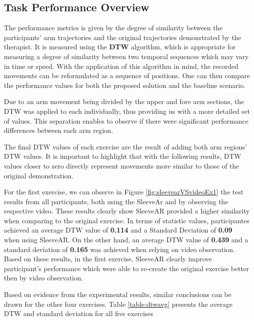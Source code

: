 \subsection{Task Performance Overview}


The performance metrics is given by the degree of similarity between the participants' arm trajectories and the original trajectories demonstrated by the therapist. 
It is measured using the \textbf{\ac{DTW}}  algorithm, which is appropriate for measuring a degree of similarity between two temporal sequences which may vary in time or speed. 
With the application of this algorithm in mind, the recorded movements can be reformulated as a sequence of positions. One can then compare the performance values for both the proposed solution and the baseline scenario.

Due to an arm movement being divided by the upper and fore arm sections, the \ac{DTW} was applied to each individually, thus providing us with a more detailed set of values. This separation enables to observe if there were significant performance differences between each arm region.

The final \ac{DTW} values of each exercise are the result of adding both arm regions' DTW values. It is important to highlight that with the following results, DTW values closer to zero directly represent movements more similar to those of the original demonstration.

For the first exercise, we can observe in Figure \ref{fig:sleevearVSvideoEx1} the test results from all participants, both using the SleeveAr and by observing the respective video.
These results clearly show SleeveAR provided a higher similarity when comparing to the original exercise. 
In terms of statistic values, participantes achieved an average \ac{DTW} value of \textbf{0.114} and a Standard Deviation of \textbf{0.09} when using SleeveAR.
On the other hand, an average \ac{DTW} value of \textbf{0.439} and a standard deviation of \textbf{0.165} was achieved when relying on video observation. 
Based on these results, in the first exercise, SleeveAR clearly improve participant's performance which were able to re-create the original exercise better then by video observation. 

Based on evidence from the experimental results, similar conclusions can be drawn for the other four exercises. Table \ref{table:dtwavg} presents the average DTW and standard deviation for all five exercises 

